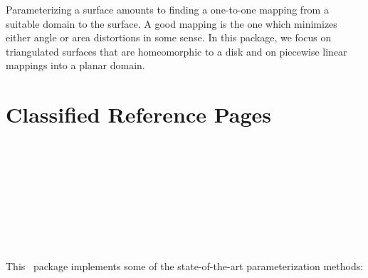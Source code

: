 



Parameterizing a surface amounts to finding a one-to-one mapping from
a suitable domain to the surface. A good mapping is the one which
minimizes either angle or area distortions in some sense. In this
package, we focus on triangulated surfaces that are homeomorphic to a
disk and on piecewise linear mappings into a planar domain.



\section{Classified Reference Pages}


  \\



  \\
  \\
  \\
  \\
  \\
  \\


This \cgal\ package implements some of
the state-of-the-art parameterization methods:

